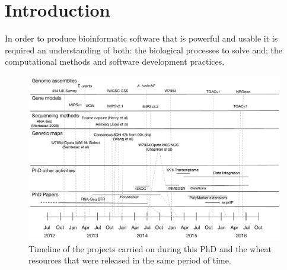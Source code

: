 
\chapter{Introduction}


In order to produce bioinformatic software that is powerful and usable it is required an understanding of both: the biological processes to solve and; the computational methods and software development practices.

\begin{landscape}
 \begin{figure}
  \centering
  \includegraphics[height=0.9\textheight]{Introduction/RicardoPhdTimelineV1.pdf}
  \caption{Timeline of the projects carried on during this PhD and the wheat resources that were released in the same period of time. }
  \label{fig:intro:timeline}
 \end{figure}
\end{landscape}